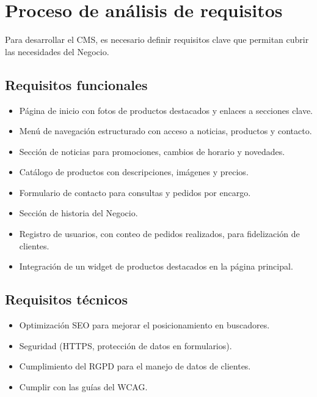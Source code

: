 \documentclass[a4paper]{article}
\begin{document}

\section{Proceso de análisis de requisitos}

Para desarrollar el CMS, es necesario definir requisitos clave que permitan cubrir las necesidades del Negocio.

\subsection{Requisitos funcionales}
\begin{itemize}

    \item Página de inicio con fotos de productos destacados y enlaces a secciones clave.

    \item Menú de navegación estructurado con acceso a noticias, productos y contacto.

    \item Sección de noticias para promociones, cambios de horario y novedades.

    \item Catálogo de productos con descripciones, imágenes y precios.

    \item Formulario de contacto para consultas y pedidos por encargo.

    \item Sección de historia del Negocio.

    \item Registro de usuarios, con conteo de pedidos realizados, para fidelización de clientes.

    \item Integración de un widget de productos destacados en la página principal.

\end{itemize}


\subsection{Requisitos técnicos}
\begin{itemize}

    \item Optimización SEO para mejorar el posicionamiento en buscadores.

    \item Seguridad (HTTPS, protección de datos en formularios).

    \item Cumplimiento del RGPD para el manejo de datos de clientes.

    \item Cumplir con las guías del WCAG.

\end{itemize}
\end{document}
